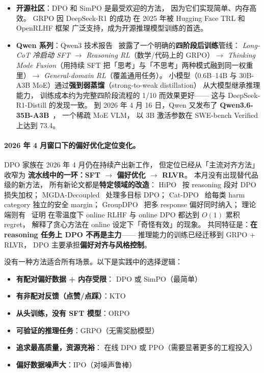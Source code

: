 \begin{itemize}[noitemsep]
        使用了 RLHF（PPO 变体）结合
        大规模 AI 评判者的偏好数据。
  \item \textbf{开源社区}：DPO 和 SimPO 是最受欢迎的方法，
        因为它们实现简单、内存高效。
        GRPO 因 DeepSeek-R1 的成功
        在 2025 年被 Hugging Face TRL 和 OpenRLHF 框架
        广泛支持，成为开源推理模型训练的首选。
  \item \textbf{Qwen 系列}：Qwen3 技术报告~\cite{qwen2025qwen3}
        披露了一个明确的\textbf{四阶段后训练}管线：
        \emph{Long-CoT 冷启动 SFT} $\to$ \emph{Reasoning RL}（数学/代码上的 GRPO）$\to$
        \emph{Thinking Mode Fusion}（用持续 SFT 把「思考」与「不思考」两种模式融到同一权重里）$\to$
        \emph{General-domain RL}（覆盖通用任务）。
        小模型（0.6B--14B 与 30B-A3B MoE）通过\textbf{强到弱蒸馏}（strong-to-weak distillation）
        从大模型继承推理能力，
        训练成本约为完整四阶段流程的 1/10 而效果更好——
        这与 DeepSeek-R1-Distill 的发现一致。
        到 2026 年 4 月 16 日，Qwen 又发布了
        \textbf{Qwen3.6-35B-A3B}~\cite{qwen2026qwen36}，
        一个稀疏 MoE VLM，
        以 3B 激活参数在 SWE-bench Verified 上达到 73.4。
\end{itemize}

\paragraph{2026 年 4 月窗口下的偏好优化定位变化。}
DPO 家族在 2026 年 4 月仍在持续产出新工作，
但定位已经从「主流对齐方法」收窄为
\textbf{流水线中的一环：SFT $\to$ 偏好优化 $\to$ RLVR}。
本月没有出现替代品级的新方法，
所有新论文都是\textbf{特定领域的改造}：
HiPO~\cite{hipo2026} 按 reasoning 段对 DPO 损失加权；
MGDA-Decoupled~\cite{mgdadecoupled2026} 处理多目标 DPO；
Cat-DPO~\cite{catdpo2026} 给每类 harm category 独立的安全 margin；
GroupDPO~\cite{groupdpo2026} 把多 response 偏好同时纳入；
理论端则有~\cite{demystifyonline2026} 证明
在零温度下 online RLHF 与 online DPO 都达到 $O(1)$ 累积 regret，
解释了贪心方法在 online 设定下「奇怪有效」的现象。
共同特征是：\textbf{在 reasoning 任务上 DPO 不再是主力}——
推理能力的训练已经迁移到 GRPO + RLVR，
DPO 主要承担\textbf{偏好对齐与风格控制}。

\begin{keybox}[偏好优化的方法选择指南]
没有一种方法适合所有场景。以下是实践中的选择逻辑：
\begin{itemize}[noitemsep]
  \item \textbf{有配对偏好数据 + 内存受限}：
        DPO 或 SimPO（最简单）
  \item \textbf{有非配对反馈（点赞/点踩）}：KTO
  \item \textbf{从头训练，没有 SFT 模型}：ORPO
  \item \textbf{可验证的推理任务}：GRPO（无需奖励模型）
  \item \textbf{追求最高质量，资源充裕}：
        在线 DPO 或 PPO（需要显著更多的工程投入）
  \item \textbf{偏好数据噪声大}：IPO（对噪声鲁棒）
\end{itemize}
\end{keybox}

